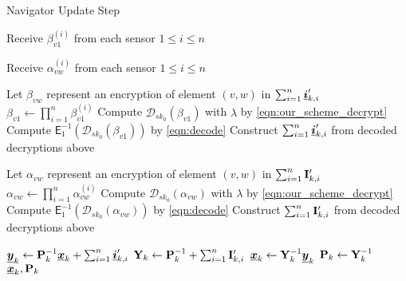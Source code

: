 \documentclass[twocolumn]{autart}
\begin{document}
\begin{algorithm}
    \caption{Navigator Update Step}\label{alg:nav_update}
    \begin{algorithmic}[1]
        
            \State Receive $\beta_{v1}^{(i)}$ from each sensor $1\leq i \leq n$
        \EndFor

            \State Receive $\alpha_{vw}^{(i)}$ from each sensor $1\leq i \leq n$
            \EndFor
        \EndFor

        \State Let $\beta_{vw}$ represent an encryption of element $(v,w)$ in $\sum_{i=1}^n{\boldsymbol{\underline{i}}}'_{k,i}$
            \State $\beta_{v1} \gets \prod_{i=1}^n\beta_{v1}^{(i)}$
            \State Compute $\mathcal{D}_{sk_0}(\beta_{v1})$ with $\lambda$ by \eqref{eqn:our_scheme_decrypt}
            \State Compute $\mathsf{E}^{-1}_{1}(\mathcal{D}_{sk_0}(\beta_{v1}))$ by \eqref{eqn:decode}
        \EndFor
        \State Construct $\sum_{i=1}^n{\boldsymbol{\underline{i}}}'_{k,i}$ from decoded decryptions above

        \State Let $\alpha_{vw}$ represent an encryption of element $(v,w)$ in $\sum_{i=1}^n{{\mathbf{I}}}'_{k,i}$
                \State $\alpha_{vw} \gets \prod_{i=1}^n\alpha_{vw}^{(i)}$
                \State Compute $\mathcal{D}_{sk_0}(\alpha_{vw})$ with $\lambda$ by \eqref{eqn:our_scheme_decrypt}
                \State Compute $\mathsf{E}^{-1}_{1}(\mathcal{D}_{sk_0}(\alpha_{vw}))$ by \eqref{eqn:decode}
            \EndFor
        \EndFor
        \State Construct $\sum_{i=1}^n{{\mathbf{I}}}'_{k,i}$ from decoded decryptions above

        \State ${\boldsymbol{\underline{y}}}_k \gets {\ensuremath{{\mathbf{P}}}}_{k}^{-1}{\boldsymbol{\underline{x}}}_{k} + \sum_{i=1}^n{\boldsymbol{\underline{i}}}'_{k,i}$
        \State ${{\mathbf{Y}}}_k \gets {\ensuremath{{\mathbf{P}}}}_{k}^{-1} + \sum_{i=1}^n{{\mathbf{I}}}'_{k,i}$
        \State ${\boldsymbol{\underline{x}}}_{k} \gets {\ensuremath{{\mathbf{Y}}}}_k^{-1}{\boldsymbol{\underline{y}}}_k$
        \State ${{\mathbf{P}}}_{k} \gets {\ensuremath{{\mathbf{Y}}}}_k^{-1}$
        \State \Return ${\boldsymbol{\underline{x}}}_{k}, {{\mathbf{P}}}_{k}$
        \EndProcedure
    \end{algorithmic}
\end{algorithm}


% 
% 
\end{document}
